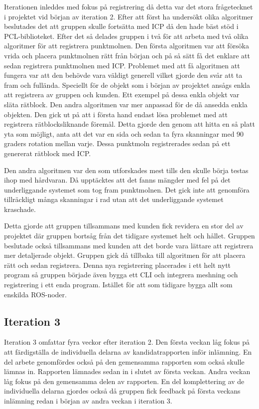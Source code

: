 Iterationen inleddes med fokus på registrering då detta var det stora frågetecknet i projektet vid början av iteration 2. Efter att först ha undersökt olika algoritmer beslutades det att gruppen skulle fortsätta med ICP då den hade bäst stöd i PCL-biblioteket. Efter det så delades gruppen i två för att arbeta med två olika algoritmer för att registrera punktmolnen. Den första algoritmen var att försöka vrida och placera punktmolnen rätt från början och på så sätt få det enklare att sedan registrera punktmolnen med ICP. Problemet med att få algoritmen att fungera var att den behövde vara väldigt generell vilket gjorde den svår att ta fram och fullända. Speciellt för de objekt som i början av projektet ansågs enkla att registrera av gruppen och kunden. Ett exempel på dessa enkla objekt var släta rätblock. Den andra algoritmen var mer anpassad för de då ansedda enkla objekten. Den gick ut på att i första hand endast lösa problemet med att registrera rätblocksliknande föremål. Detta gjorde den genom att hitta en så platt yta som möjligt, anta att det var en sida och sedan ta fyra skanningar med 90 graders rotation mellan varje. Dessa punktmoln registrerades sedan på ett genererat rätblock med ICP.

Den andra algoritmen var den som utforskades mest tills den skulle börja testas ihop med hårdvaran. Då upptäcktes att det fanns mängder med fel på det underliggande systemet som tog fram punktmolnen. Det gick inte att genomföra tillräckligt många skanningar i rad utan att det underliggande systemet kraschade.

Detta gjorde att gruppen tillsammans med kunden fick revidera en stor del av projektet där gruppen bortsåg från det tidigare systemet helt och hållet. Gruppen beslutade också tillsammans med kunden att det borde vara lättare att registrera mer detaljerade objekt. Gruppen gick då tillbaka till algoritmen för att placera rätt och sedan registrera. Denna nya registrering placerades i ett helt nytt program så gruppen började även bygga ett CLI och integrera meshning och registrering i ett enda program. Istället för att som tidigare bygga allt som enskilda ROS-noder.

\subsection{Iteration 3}

Iteration 3 omfattar fyra veckor efter iteration 2. Den första veckan låg fokus på att färdigställa de individuella delarna av kandidatrapporten inför inlämning. En del arbete genomfördes också på den gemensamma rapporten som också skulle lämnas in. Rapporten lämnades sedan in i slutet av första veckan. Andra veckan låg fokus på den gemensamma delen av rapporten. En del komplettering av de individuella delarna gjordes också då gruppen fick feedback på första veckans inlämning redan i början av andra veckan i iteration 3.



